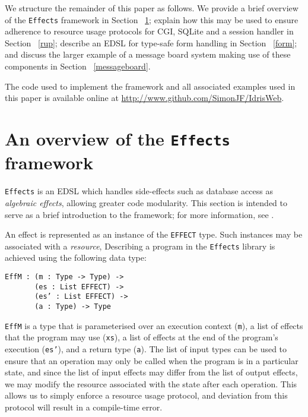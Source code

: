 \documentclass[preprint]{sigplanconf}
\begin{document}
We structure the remainder of this paper as follows. We provide a brief overview of the \texttt{Effects} framework in Section ~\ref{effects}; explain how this may be used to ensure adherence to resource usage protocols for CGI, SQLite and a session handler in Section ~\ref{rup}; describe an EDSL for type-safe form handling in Section ~\ref{form}; and discuss the larger example of a message board system making use of these components in Section ~\ref{messageboard}.

The code used to implement the framework and all associated examples used in this paper is available online at \url{http://www.github.com/SimonJF/IdrisWeb}.

\section{An overview of the \texttt{Effects} framework}
\label{effects}
\texttt{Effects} is an EDSL which handles side-effects such as database access as \textit{algebraic effects}, allowing greater code modularity. This section is intended to serve as a brief introduction to the framework; for more information, see \cite{brady:effects}.

An effect is represented as an instance of the \texttt{EFFECT} type. Such instances may be associated with a \textit{resource}, 
Describing a program in the \texttt{Effects} library is achieved using the following data type:
\begin{Verbatim}
EffM : (m : Type -> Type) ->
       (es : List EFFECT) ->
       (es’ : List EFFECT) ->
       (a : Type) -> Type
\end{Verbatim}
\texttt{EffM} is a type that is parameterised over an execution context (\texttt{m}), a list of effects that the program may use (\texttt{xs}), a list of effects at the end of the program's execution (\texttt{es'}), and a return type (\texttt{a}). The list of input types can be used to ensure that an operation may only be called when the program is in a particular state, and since the list of input effects may differ from the list of output effects, we may modify the resource associated with the state after each operation. This allows us to simply enforce a resource usage protocol, and deviation from this protocol will result in a compile-time error.
\end{document}
